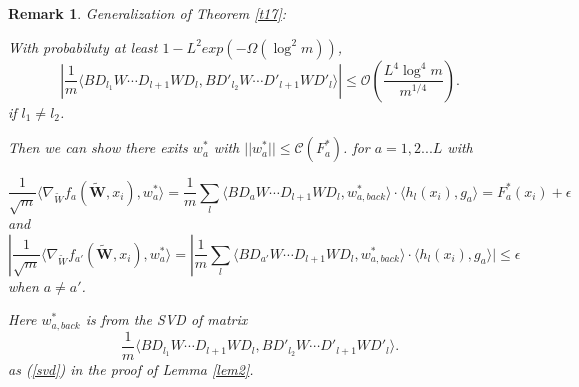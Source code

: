\documentclass{article}
\newcommand{\cO}{\mathcal{O}}
\newtheorem{rem}{\textbf{Remark}}[section]
\begin{document}
\begin{rem}
Generalization of Theorem \ref{t17}:

With probabiluty at least $1-L^2exp(-\Omega(\log^2m))$,
\begin{equation}
|\frac{1}{m}\langle BD_{l_1}W\cdots D_{l+1}WD_l,BD'_{l_2}W\cdots D'_{l+1}WD'_l \rangle| \leq \cO(\frac{L^4\log^4 m}{m^{1/4}}).
\end{equation}
if $l_1\neq l_2$.

 Then we can show there exits $w^*_a$ with $||w^*_a||\leq \mathscr{C}(F_a^*)$. for $a=1,2...L$ with

 \begin{equation}
\frac{1}{\sqrt{m}}\langle \nabla_{\widetilde{W}} f_a(\widetilde{\bm{W}},x_i), w^*_{a} \rangle=\frac{1}{m}\sum_{l}\langle BD_{a}W\cdots D_{l+1}WD_l,w^*_{a,back} \rangle\cdot \langle h_l(x_i), g_{a}\rangle=F^*_a(x_i)+\epsilon
\end{equation}
and
\begin{equation}
|\frac{1}{\sqrt{m}}\langle \nabla_{\widetilde{W}} f_{a'}(\widetilde{\bm{W}},x_i), w^*_{a} \rangle=|\frac{1}{m}\sum_{l}\langle BD_{a'}W\cdots D_{l+1}WD_l,w^*_{a,back} \rangle\cdot \langle h_l(x_i), g_{a}\rangle|\leq \epsilon
\end{equation}
when $a\neq a'$.

Here $w^*_{a,back}$ is from the SVD of matrix $$\frac{1}{m}\langle BD_{l_1}W\cdots D_{l+1}WD_l,BD'_{l_2}W\cdots D'_{l+1}WD'_l \rangle.$$
as (\ref{svd}) in the proof of Lemma \ref{lem2}.
\end{rem}
\end{document}
